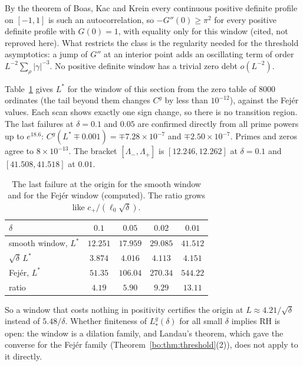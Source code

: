 By the theorem of Boas, Kac and Krein every continuous positive definite profile on $[-1,1]$ is such an autocorrelation, so $-G''(0)\ge\pi^2$ for every positive definite profile with $G(0)=1$, with equality only for this window (cited, not reproved here). What restricts the class is the regularity needed for the threshold asymptotics: a jump of $G''$ at an interior point adds an oscillating term of order $L^{-2}\sum_\rho|\gamma|^{-3}$. No positive definite window has a trivial zero debt $o(L^{-2})$. %

\begin{remark}[Computation]\label{bo:comp:smooth}
Table~\ref{bo:tab:smooth} gives $L^*$ for the window of this section from the zero table of $8000$ ordinates (the tail beyond them changes $C^g$ by less than $10^{-12}$), against the Fej\'er values. Each scan shows exactly one sign change, so there is no transition region. The last failures at $\delta=0.1$ and $0.05$ are confirmed directly from all prime powers up to $e^{18.6}$: $C^g(L^*\mp0.001)=\mp7.28\times10^{-7}$ and $\mp2.50\times10^{-7}$. Primes and zeros agree to $8\times10^{-13}$. The bracket $[\Lambda_-,\Lambda_+]$ is $[12.246,12.262]$ at $\delta=0.1$ and $[41.508,41.518]$ at $0.01$.
\end{remark}

\begin{table}[ht]
\centering\small
\begin{tabular}{@{}lcccc@{}}
\toprule
$\delta$ & $0.1$ & $0.05$ & $0.02$ & $0.01$\\
\midrule
smooth window, $L^*$ & $12.251$ & $17.959$ & $29.085$ & $41.512$\\
$\sqrt\delta\,L^*$ & $3.874$ & $4.016$ & $4.113$ & $4.151$\\
Fej\'er, $L^*$ & $51.35$ & $106.04$ & $270.34$ & $544.22$\\
ratio & $4.19$ & $5.90$ & $9.29$ & $13.11$\\
\bottomrule
\end{tabular}
\caption{The last failure at the origin for the smooth window and for the Fej\'er window (computed). The ratio grows like $c_+/(\ell_0\sqrt\delta)$.}
\label{bo:tab:smooth}
\end{table}

So a window that costs nothing in positivity certifies the origin at $L\approx4.21/\sqrt\delta$ instead of $5.48/\delta$. Whether finiteness of $L^g_*(\delta)$ for all small $\delta$ implies RH is open: the window is a dilation family, and Landau's theorem, which gave the converse for the Fej\'er family (Theorem~\ref{bo:thm:threshold}(2)), does not apply to it directly.

